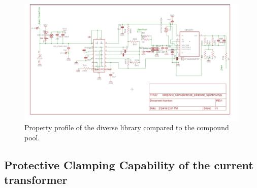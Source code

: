     
    \newpage
    
    	\begin{figure}
\includegraphics[width=0.99\textwidth]{figures/Method/integrator/schematic.jpg}
 \caption{Property profile of the diverse library compared to the compound pool.}
  \end{figure}	

	



\subsection{Protective Clamping Capability of the current transformer}
\label{clamping}

